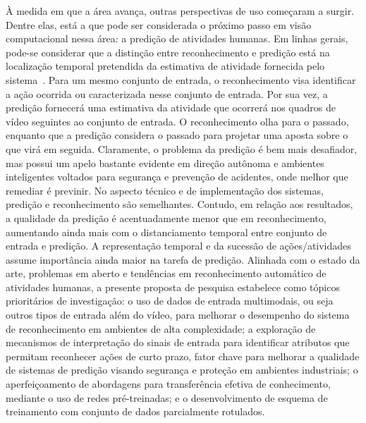 %
À medida em que a área avança, outras perspectivas de uso começaram a surgir. Dentre elas, está a que pode ser considerada o próximo passo em visão computacional nessa área: a predição de atividades humanas. Em linhas gerais, pode-se considerar que a distinção entre reconhecimento e predição está na localização temporal pretendida da estimativa de atividade fornecida pelo sistema~\parencite{kongr-2018}. Para um mesmo conjunto de entrada, o reconhecimento visa identificar a ação ocorrida ou caracterizada nesse conjunto de entrada. Por sua vez, a predição fornecerá uma estimativa da atividade que ocorrerá nos quadros de vídeo seguintes ao conjunto de entrada. O reconhecimento olha para o passado, enquanto que a predição considera o passado para projetar uma aposta sobre o que virá em seguida. Claramente, o problema da predição é bem mais desafiador, mas possui um apelo bastante evidente em direção autônoma e ambientes inteligentes voltados para segurança e prevenção de acidentes, onde melhor que remediar é previnir. No aspecto técnico e de implementação dos sistemas, predição e reconhecimento são semelhantes. Contudo, em relação aos resultados, a qualidade da predição é acentuadamente menor que em reconhecimento, aumentando ainda mais com o distanciamento temporal entre conjunto de entrada e predição. A representação temporal e da sucessão de ações/atividades assume importância ainda maior na tarefa de predição.
%
Alinhada com o estado da arte, problemas em aberto e tendências em reconhecimento automático de atividades humanas, a presente proposta de pesquisa estabelece como tópicos prioritários de investigação: o uso de dados de entrada  multimodais, ou seja outros tipos de entrada além do vídeo, para melhorar o desempenho do sistema de reconhecimento em ambientes de alta complexidade; a exploração de mecanismos de interpretação do sinais de entrada para identificar atributos que permitam reconhecer ações de curto prazo, fator chave para melhorar a qualidade de sistemas de predição visando segurança e proteção em ambientes industriais; o aperfeiçoamento de abordagens para transferência efetiva de conhecimento, mediante o uso de redes pré-treinadas; e o desenvolvimento de esquema de treinamento com conjunto de dados parcialmente rotulados.
